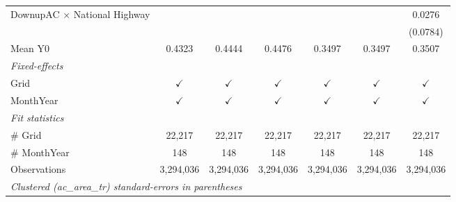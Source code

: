 \begin{table}[htbp]
\begin{tabular}{lcccccc}
      DownupAC $\times$ National Highway                         &               &               &               &               &               & 0.0276\\   
                                                                 &               &               &               &               &               & (0.0784)\\   
      \hline Mean Y0                                             & 0.4323        & 0.4444        & 0.4476        & 0.3497        & 0.3497        & 0.3507\\  
      \midrule
      \emph{Fixed-effects}\\
      Grid                                                       & $\checkmark$  & $\checkmark$  & $\checkmark$  & $\checkmark$  & $\checkmark$  & $\checkmark$\\   
      MonthYear                                                  & $\checkmark$  & $\checkmark$  & $\checkmark$  & $\checkmark$  & $\checkmark$  & $\checkmark$\\   
      \midrule
      \emph{Fit statistics}\\
      \# Grid                                                    & 22,217        & 22,217        & 22,217        & 22,217        & 22,217        & 22,217\\  
      \# MonthYear                                               & 148           & 148           & 148           & 148           & 148           & 148\\  
      Observations                                               & 3,294,036     & 3,294,036     & 3,294,036     & 3,294,036     & 3,294,036     & 3,294,036\\  
      \midrule \midrule
      \multicolumn{7}{l}{\emph{Clustered (ac\_area\_tr) standard-errors in parentheses}}\\
   \end{tabular}
\end{table}


